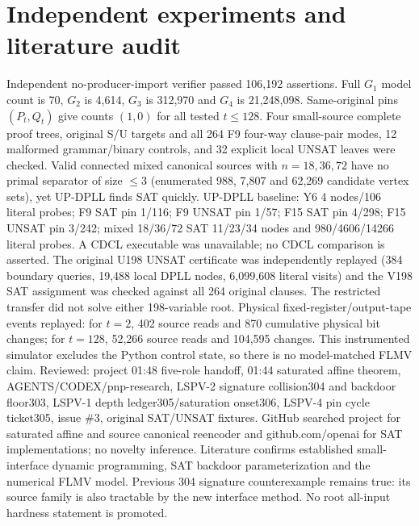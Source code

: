 \documentclass[11pt]{article}
\begin{document}
\section{Independent experiments and literature audit}
Independent no-producer-import verifier passed 106,192 assertions. Full $G_1$ model count is 70, $G_2$ is 4,614, $G_3$ is 312,970 and $G_4$ is 21,248,098. Same-original pins $(P_t,Q_t)$ give counts $(1,0)$ for all tested $t\le128$. Four small-source complete proof trees, original S/U targets and all 264 F9 four-way clause-pair modes, 12 malformed grammar/binary controls, and 32 explicit local UNSAT leaves were checked. Valid connected mixed canonical sources with $n=18,36,72$ have no primal separator of size $\le3$ (enumerated 988, 7,807 and 62,269 candidate vertex sets), yet UP-DPLL finds SAT quickly. UP-DPLL baseline: Y6 4 nodes/106 literal probes; F9 SAT pin 1/116; F9 UNSAT pin 1/57; F15 SAT pin 4/298; F15 UNSAT pin 3/242; mixed 18/36/72 SAT 11/23/34 nodes and 980/4606/14266 literal probes. A CDCL executable was unavailable; no CDCL comparison is asserted. The original U198 UNSAT certificate was independently replayed (384 boundary queries, 19,488 local DPLL nodes, 6,099,608 literal visits) and the V198 SAT assignment was checked against all 264 original clauses. The restricted transfer did not solve either 198-variable root.
Physical fixed-register/output-tape events replayed: for $t=2$, 402 source reads and 870 cumulative physical bit changes; for $t=128$, 52,266 source reads and 104,595 changes. This instrumented simulator excludes the Python control state, so there is no model-matched FLMV claim.
Reviewed: project 01:48 five-role handoff, 01:44 saturated affine theorem, AGENTS/CODEX/pnp-research, LSPV-2 signature collision304 and backdoor floor303, LSPV-1 depth ledger305/saturation onset306, LSPV-4 pin cycle ticket305, issue \#3, original SAT/UNSAT fixtures. GitHub searched project for saturated affine and source canonical reencoder and github.com/openai for SAT implementations; no novelty inference. Literature confirms established small-interface dynamic programming, SAT backdoor parameterization and the numerical FLMV model. Previous 304 signature counterexample remains true: its source family is also tractable by the new interface method. No root all-input hardness statement is promoted.
\end{document}
